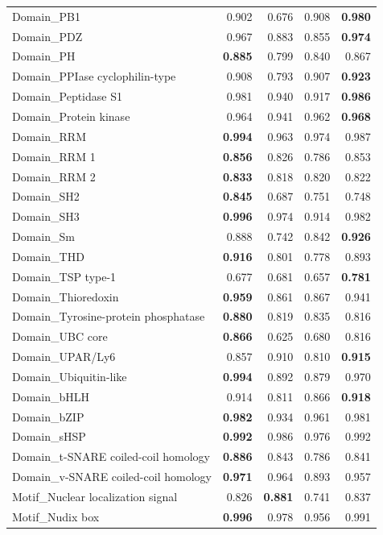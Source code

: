 \documentclass{article}
\begin{document}
\begin{longtable}{p{6.0cm}rrrr}
Domain\_PB1 & 0.902 & 0.676 & 0.908 & \textbf{0.980} \\
Domain\_PDZ & 0.967 & 0.883 & 0.855 & \textbf{0.974} \\
Domain\_PH & \textbf{0.885} & 0.799 & 0.840 & 0.867 \\
Domain\_PPIase cyclophilin-type & 0.908 & 0.793 & 0.907 & \textbf{0.923} \\
Domain\_Peptidase S1 & 0.981 & 0.940 & 0.917 & \textbf{0.986} \\
Domain\_Protein kinase & 0.964 & 0.941 & 0.962 & \textbf{0.968} \\
Domain\_RRM & \textbf{0.994} & 0.963 & 0.974 & 0.987 \\
Domain\_RRM 1 & \textbf{0.856} & 0.826 & 0.786 & 0.853 \\
Domain\_RRM 2 & \textbf{0.833} & 0.818 & 0.820 & 0.822 \\
Domain\_SH2 & \textbf{0.845} & 0.687 & 0.751 & 0.748 \\
Domain\_SH3 & \textbf{0.996} & 0.974 & 0.914 & 0.982 \\
Domain\_Sm & 0.888 & 0.742 & 0.842 & \textbf{0.926} \\
Domain\_THD & \textbf{0.916} & 0.801 & 0.778 & 0.893 \\
Domain\_TSP type-1 & 0.677 & 0.681 & 0.657 & \textbf{0.781} \\
Domain\_Thioredoxin & \textbf{0.959} & 0.861 & 0.867 & 0.941 \\
Domain\_Tyrosine-protein phosphatase & \textbf{0.880} & 0.819 & 0.835 & 0.816 \\
Domain\_UBC core & \textbf{0.866} & 0.625 & 0.680 & 0.816 \\
Domain\_UPAR/Ly6 & 0.857 & 0.910 & 0.810 & \textbf{0.915} \\
Domain\_Ubiquitin-like & \textbf{0.994} & 0.892 & 0.879 & 0.970 \\
Domain\_bHLH & 0.914 & 0.811 & 0.866 & \textbf{0.918} \\
Domain\_bZIP & \textbf{0.982} & 0.934 & 0.961 & 0.981 \\
Domain\_sHSP & \textbf{0.992} & 0.986 & 0.976 & 0.992 \\
Domain\_t-SNARE coiled-coil homology & \textbf{0.886} & 0.843 & 0.786 & 0.841 \\
Domain\_v-SNARE coiled-coil homology & \textbf{0.971} & 0.964 & 0.893 & 0.957 \\
Motif\_Nuclear localization signal & 0.826 & \textbf{0.881} & 0.741 & 0.837 \\
Motif\_Nudix box & \textbf{0.996} & 0.978 & 0.956 & 0.991 \\

\end{longtable}
\end{document}
